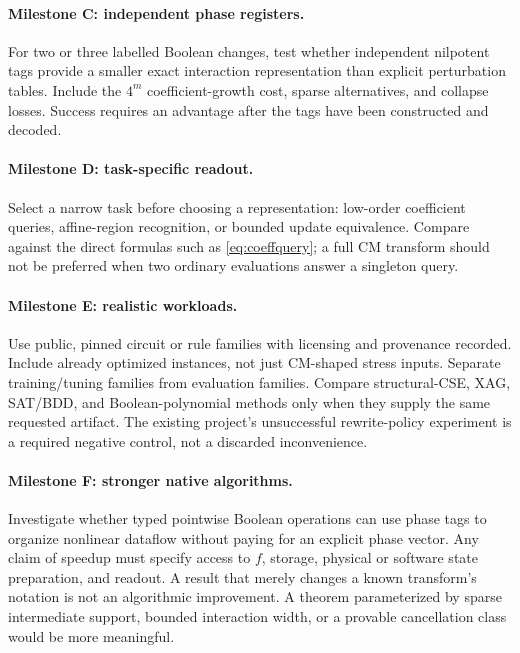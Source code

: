 \documentclass[11pt,a4paper]{article}
\theoremstyle{definition}\newtheorem{definition}[theorem]{Definition}
\theoremstyle{remark}\newtheorem{remark}[theorem]{Remark}
\numberwithin{equation}{section}
\begin{document}
\paragraph{Milestone C: independent phase registers.}
For two or three labelled Boolean changes, test whether independent nilpotent tags provide a smaller exact interaction representation than explicit perturbation tables. Include the $4^m$ coefficient-growth cost, sparse alternatives, and collapse losses. Success requires an advantage after the tags have been constructed and decoded.

\paragraph{Milestone D: task-specific readout.}
Select a narrow task before choosing a representation: low-order coefficient queries, affine-region recognition, or bounded update equivalence. Compare against the direct formulas such as \cref{eq:coeffquery}; a full CM transform should not be preferred when two ordinary evaluations answer a singleton query.

\paragraph{Milestone E: realistic workloads.}
Use public, pinned circuit or rule families with licensing and provenance recorded. Include already optimized instances, not just CM-shaped stress inputs. Separate training/tuning families from evaluation families. Compare structural-CSE, XAG, SAT/BDD, and Boolean-polynomial methods only when they supply the same requested artifact. The existing project's unsuccessful rewrite-policy experiment is a required negative control, not a discarded inconvenience.

\paragraph{Milestone F: stronger native algorithms.}
Investigate whether typed pointwise Boolean operations can use phase tags to organize nonlinear dataflow without paying for an explicit phase vector. Any claim of speedup must specify access to $f$, storage, physical or software state preparation, and readout. A result that merely changes a known transform's notation is not an algorithmic improvement. A theorem parameterized by sparse intermediate support, bounded interaction width, or a provable cancellation class would be more meaningful.
\end{document}
